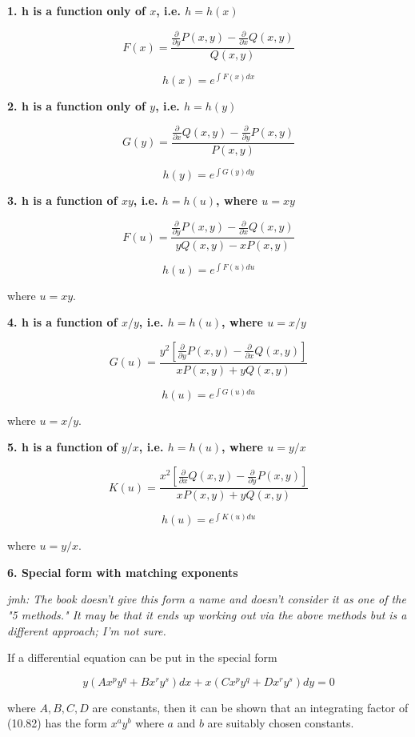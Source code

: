 \documentclass{article}
\begin{document}
\textbf{1. h is a function only of $x$, i.e. $h = h(x)$}

\[ \tag{10.65} F(x) = \frac{\frac{\partial}{\partial y}P(x,y) - \frac{\partial}{\partial x}Q(x,y)}{Q(x,y)} \]

\[ \tag{10.66} h(x) = e^{\int F(x)dx} \]

\textbf{2. h is a function only of $y$, i.e. $h = h(y)$}

\[ \tag{10.65} G(y) = \frac{\frac{\partial}{\partial x}Q(x,y) - \frac{\partial}{\partial y}P(x,y)}{P(x,y)} \]

\[ \tag{10.66} h(y) = e^{\int G(y)dy} \]

\textbf{3. h is a function of $xy$, i.e. $h = h(u)$, where $u = xy$}

\[ \tag{10.65} F(u) = \frac{\frac{\partial}{\partial y}P(x,y) - \frac{\partial}{\partial x}Q(x,y)}{yQ(x,y) - xP(x,y)} \]

\[ \tag{10.66} h(u) = e^{\int F(u)du} \]

where $u = xy$.

\textbf{4. h is a function of $x/y$, i.e. $h = h(u)$, where $u = x/y$}

\[ \tag{10.65} G(u) = \frac{y^2[\frac{\partial}{\partial y}P(x,y) - \frac{\partial}{\partial x}Q(x,y)]}{xP(x,y) + yQ(x,y)} \]

\[ \tag{10.66} h(u) = e^{\int G(u)du} \]

where $u = x/y$.

\textbf{5. h is a function of $y/x$, i.e. $h = h(u)$, where $u = y/x$}

\[ \tag{10.65} K(u) = \frac{x^2[\frac{\partial}{\partial x}Q(x,y) - \frac{\partial}{\partial y}P(x,y)]}{xP(x,y) + yQ(x,y)} \]

\[ \tag{10.66} h(u) = e^{\int K(u)du} \]

where $u = y/x$.

\textbf{6. Special form with matching exponents}

\emph{jmh: The book doesn't give this form a name and doesn't consider it as one of the "5 methods." It may be that it ends up working out via the above methods but is a different approach; I'm not sure.}

If a differential equation can be put in the special form

\[ \tag{10.82} y(Ax^py^q+Bx^ry^s)dx + x(Cx^py^q + Dx^ry^s)dy = 0 \]

where $A, B, C, D$ are constants, then it can be shown that an integrating factor of (10.82) has the form $x^ay^b$ where $a$ and $b$ are suitably chosen constants.
\end{document}
